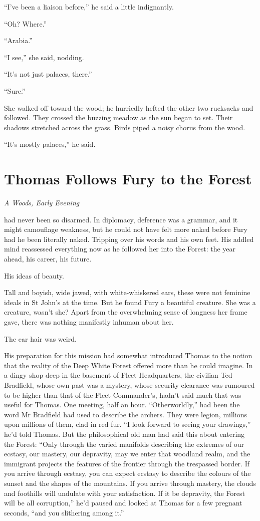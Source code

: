 \documentclass[11pt,a5paper]{article}
\newcommand{\alet}[1]{\textit{#1}\vspace{1em}}
\begin{document}
``I've been a liaison before,'' he said a little indignantly.

``Oh? Where.''

``Arabia.''

``I see,'' she said, nodding.

``It's not just palaces, there.''

``Sure.''

She walked off toward the wood; he hurriedly hefted the other two rucksacks and followed. They crossed the buzzing meadow as the sun began to set. Their shadows stretched across the grass. Birds piped a noisy chorus from the wood.

``It's mostly palaces,'' he said.

\newpage

\section{Thomas Follows Fury to the Forest}

\alet{A Woods, Early Evening}

 had never been so disarmed. In diplomacy, deference was a grammar, and it might camouflage weakness, but he could not have felt more naked before Fury had he been literally naked. Tripping over his words and his own feet. His addled mind reassessed everything now as he followed her into the Forest: the year ahead, his career, his future.

His ideas of beauty.

Tall and boyish, wide jawed, with white-whiskered ears, these were not feminine ideals in St John's at the time. But he found Fury a beautiful creature. She was a creature, wasn't she? Apart from the overwhelming sense of longness her frame gave, there was nothing manifestly inhuman about her.

The ear hair was weird.

His preparation for this mission had somewhat introduced Thomas to the notion that the reality of the Deep White Forest offered more than he could imagine. In a dingy shop deep in the basement of Fleet Headquarters, the civilian Ted Bradfield, whose own past was a mystery, whose security clearance was rumoured to be higher than that of the Fleet Commander's, hadn't said much that was useful for Thomas. One meeting, half an hour. ``Otherworldly,'' had been the word Mr Bradfield had used to describe the archers. They were legion, millions upon millions of them, clad in red fur. ``I look forward to seeing your drawings,'' he'd told Thomas. But the philosophical old man had said this about entering the Forest: ``Only through the varied manifolds describing the extremes of our ecstasy, our mastery, our depravity, may we enter that woodland realm, and the immigrant projects the features of the frontier through the trespassed border. If you arrive through ecstasy, you can expect ecstasy to describe the colours of the sunset and the shapes of the mountains. If you arrive through mastery, the clouds and foothills will undulate with your satisfaction. If it be depravity, the Forest will be all corruption,'' he'd paused and looked at Thomas for a few pregnant seconds, ``and you slithering among it.''
\end{document}
